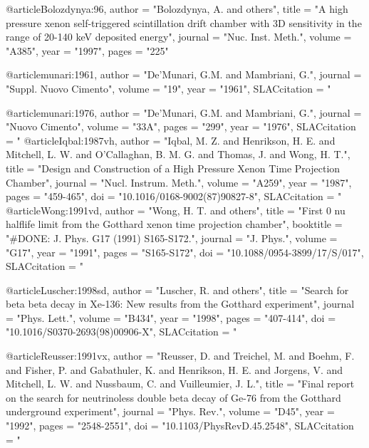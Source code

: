 @article{Bolozdynya:96,
     author	= "Bolozdynya, A. and others",
     title	= "{A high pressure xenon self-triggered scintillation drift chamber with
			3D sensitivity in the range of 20-140 keV deposited energy}",
     journal	= "Nuc. Inst. Meth.",
     volume	= "A385",
     year	= "1997",
     pages	= "225"	
}

@article{munari:1961,
      author         = "De'Munari, G.M. and Mambriani, G.",
      journal        = "Suppl. Nuovo Cimento",
      volume         = "19",
      year           = "1961",
      SLACcitation   = "%
}

@article{munari:1976,
      author         = "De'Munari, G.M. and Mambriani, G.",
      journal        = "Nuovo Cimento",
      volume         = "33A",
       pages          = "299",
      year           = "1976",
      SLACcitation   = "%
}
@article{Iqbal:1987vh,
      author         = "Iqbal, M. Z. and Henrikson, H. E. and Mitchell, L. W. and
                        O'Callaghan, B. M. G. and Thomas, J. and Wong, H. T.",
      title          = "{Design and Construction of a High Pressure Xenon Time
                        Projection Chamber}",
      journal        = "Nucl. Instrum. Meth.",
      volume         = "A259",
      year           = "1987",
      pages          = "459-465",
      doi            = "10.1016/0168-9002(87)90827-8",
      SLACcitation   = "%
}
@article{Wong:1991vd,
      author         = "Wong, H. T. and others",
      title          = "{First 0 nu halflife limit from the Gotthard xenon time
                        projection chamber}",
      booktitle      = "{\#DONE: J. Phys. G17 (1991) S165-S172.}",
      journal        = "J. Phys.",
      volume         = "G17",
      year           = "1991",
      pages          = "S165-S172",
      doi            = "10.1088/0954-3899/17/S/017",
      SLACcitation   = "%
}	

@article{Luscher:1998sd,
      author         = "Luscher, R. and others",
      title          = "{Search for beta beta decay in Xe-136: New results from
                        the Gotthard experiment}",
      journal        = "Phys. Lett.",
      volume         = "B434",
      year           = "1998",
      pages          = "407-414",
      doi            = "10.1016/S0370-2693(98)00906-X",
      SLACcitation   = "%
}

@article{Reusser:1991vx,
      author         = "Reusser, D. and Treichel, M. and Boehm, F. and Fisher, P.
                        and Gabathuler, K. and Henrikson, H. E. and Jorgens, V.
                        and Mitchell, L. W. and Nussbaum, C. and Vuilleumier, J.
                        L.",
      title          = "{Final report on the search for neutrinoless double beta
                        decay of Ge-76 from the Gotthard underground experiment}",
      journal        = "Phys. Rev.",
      volume         = "D45",
      year           = "1992",
      pages          = "2548-2551",
      doi            = "10.1103/PhysRevD.45.2548",
      SLACcitation   = "%
}

